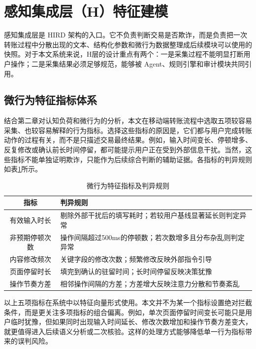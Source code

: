 \documentclass{xduugthesis}
\begin{document}
\section{感知集成层（H）特征建模}

感知集成层是 HIRD 架构的入口。它不负责判断交易是否欺诈，而是负责把一次转账过程中分散出现的文本、结构化参数和微行为数据整理成后续模块可以使用的快照。对于本文系统来说，H层的设计重点有两个：一是采集过程不能明显打断用户操作；二是采集结果必须足够规范，能够被 Agent、规则引擎和审计模块共同引用。

\subsection{微行为特征指标体系}

结合第二章对认知负荷和微行为的分析，本文在移动端转账流程中选取五项较容易采集、也较容易解释的行为指标。选择这些指标的原因是，它们都与用户完成转账动作的过程有关，而不是只描述交易最终结果。例如，输入时间变长、停顿增多、反复修改或确认前长时间停留，都可能提示用户正在受到外部信息干扰。当然，这些指标不能单独证明欺诈，只能作为后续综合判断的辅助证据。各指标的判异规则如表\ref{tab:micro-behavior}所示。

\begin{table}[H]
    \centering
    \caption{微行为特征指标及判异规则}
    \label{tab:micro-behavior}
    \begin{tabular}{|c|p{8cm}|}
        \hline
        指标 & 判异规则 \\
        \hline
        有效输入时长 & 剔除外部干扰后的填写耗时；若较用户基线显著延长则判定异常 \\
        \hline
        非预期停顿次数 & 操作间隔超过500ms的停顿数；若次数增多且分布杂乱则判定异常 \\
        \hline
        内容修改频次 & 关键字段的修改次数；频繁修改反映外部指令引导 \\
        \hline
        页面停留时长 & 填完到确认的驻留时间；长时间停留反映决策犹豫 \\
        \hline
        操作节奏方差 & 相邻操作间隔的方差；方差增大反映注意力分散和节奏紊乱 \\
        \hline
    \end{tabular}
\end{table}

以上五项指标在系统中以特征向量形式使用。本文并不为某一个指标设置绝对拦截条件，而是更关注多项指标的组合偏离。例如，单次页面停留时间变长可能只是用户临时犹豫，但如果同时出现输入时间延长、修改次数增加和操作节奏方差变大，就更值得进入后续语义分析或二次核验。这样的处理方式能够降低单一行为指标带来的误判风险。
\end{document}
